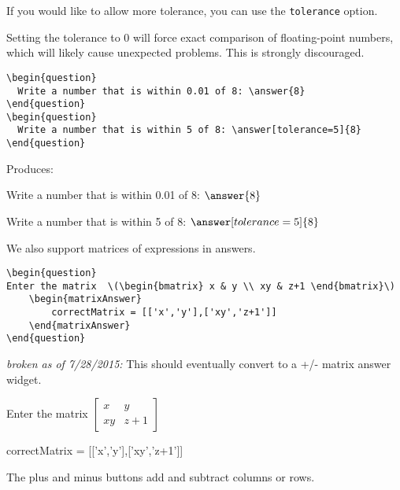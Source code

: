 \documentclass{ximera}
\begin{document}
\begin{example} If you would like to allow more tolerance, you can use the \verb!tolerance! option. 

\begin{warning}
Setting the tolerance to 0 will force exact comparison of floating-point numbers, which will likely cause unexpected problems. This is strongly discouraged. 
\end{warning}

\begin{verbatim}
\begin{question}
  Write a number that is within 0.01 of 8: \answer{8}
\end{question}
\begin{question}
  Write a number that is within 5 of 8: \answer[tolerance=5]{8}
\end{question}
\end{verbatim}

Produces:

\begin{question}
  Write a number that is within 0.01 of 8: $\answer{8}$
\end{question}
\begin{question}
  Write a number that is within 5 of 8: $\answer[tolerance=5]{8}$
\end{question}
\end{example}


\begin{example} We also support matrices of expressions in answers.

\begin{verbatim}
\begin{question}
Enter the matrix  \(\begin{bmatrix} x & y \\ xy & z+1 \end{bmatrix}\)
    \begin{matrixAnswer}
	    correctMatrix = [['x','y'],['xy','z+1']]
    \end{matrixAnswer}
\end{question}
\end{verbatim}

\emph{broken as of 7/28/2015:} This should eventually convert to a +/- matrix answer widget.

\begin{question}
Enter the matrix  \(\begin{bmatrix} x & y \\ xy & z+1 \end{bmatrix}\)
\begin{matrixAnswer}
    correctMatrix = [['x','y'],['xy','z+1']]
\end{matrixAnswer}
\end{question}

\begin{remark}
  The plus and minus buttons add and subtract columns or rows.  
\end{remark}
\end{example}
\end{document}

